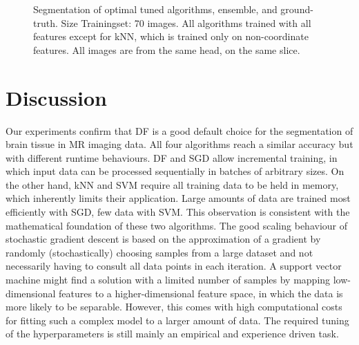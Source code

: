 \documentclass[journal]{IEEEtran}
\begin{document}
\begin{figure}[h!]
	\hfill
	\caption{Segmentation of optimal tuned algorithms, ensemble, and ground-truth. Size Trainingset: 70 images. All algorithms trained with all features except for kNN, which is trained only on non-coordinate features. All images are from the same head, on the same slice. }
	\label{f.slices_all}
\end{figure}

\section{Discussion}

Our experiments confirm that DF is a good default choice for the segmentation of brain tissue in MR imaging data. All four algorithms reach a similar accuracy but with different runtime behaviours. DF and SGD allow incremental training, in which input data can be processed sequentially in batches of arbitrary sizes. On the other hand, kNN and SVM require all training data to be held in memory, which inherently limits their application. Large amounts of data are trained most efficiently with SGD, few data with SVM. This observation is consistent with the mathematical foundation of these two algorithms. The good scaling behaviour of stochastic gradient descent is based on the approximation of a gradient by randomly (stochastically) choosing samples from a large dataset and not necessarily having to consult all data points in each iteration. A support vector machine might find a solution with a limited number of samples by mapping low-dimensional features to a higher-dimensional feature space, in which the data is more likely to be separable. However, this comes with high computational costs for fitting such a complex model to a larger amount of data. The required tuning of the hyperparameters is still mainly an empirical and experience driven task.
\end{document}
